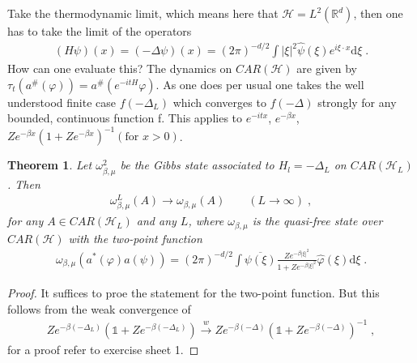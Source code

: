 \documentclass[
a4paper, %
11pt, %
onecolumn, %
openany, %
]{memoir}
\theoremstyle{definition}
\theoremstyle{remark}
\theoremstyle{plain}
\newtheorem{theorem}{Theorem}[chapter]
\begin{document}
Take the thermodynamic limit, which means here that $\mathcal{H}=L^2(\mathbb{R}^d)$, then one has to take the limit of the operators \begin{align}
(H\psi)(x)=(-\Delta \psi)(x)=(2\pi)^{-d/2}\int |\xi|^2\hat{\psi}(\xi)e^{i\xi\cdot x}\mathrm{d}\xi\; .
\end{align}
How can one evaluate this? The dynamics on $CAR(\mathcal{H})$ are given by $\tau_t(a^{\#}(\varphi))=a^{\#}(e^{-itH}\varphi)$. As one does per usual one takes the well understood finite case $f(-\Delta_L)$ which converges to $f(-\Delta)$ strongly for any bounded, continuous function f. This applies to $e^{-itx}$, $e^{-\beta x}$, $Ze^{-\beta x}(1+Ze^{-\beta x})^{-1} (\text{for }x>0)$.
\begin{theorem}
	Let $\omega_{\beta,\mu}^2$ be the Gibbs state associated to $H_l=-\Delta_L$ on $CAR(\mathcal{H}_L)$. Then \begin{align*}
	\omega_{\beta,\mu}^L(A)\overset{}{\longrightarrow}\omega_{\beta,\mu}(A) \qquad (L\rightarrow \infty)\; ,
	\end{align*}
	for any $A\in CAR(\mathcal{H}_{L})$ and any $L$, where $\omega_{\beta,\mu}$ is the quasi-free state over $CAR(\mathcal{H})$ with the two-point function \begin{align}
		\omega_{\beta,\mu}(a^*(\varphi)a(\psi))=(2\pi)^{-d/2}\int\overline{\psi(\xi)}\frac{Ze^{-\beta |\xi|^2}}{1+Ze^{-\beta|\xi|^2}}\hat{\varphi}(\xi)\mathrm{d}\xi\; .
	\end{align}
\end{theorem}
\begin{proof}
	It suffices to proe the statement for the two-point function. But this follows from the weak convergence of \begin{align}
	Ze^{-\beta(-\Delta_L)}(\mathds{1}+Ze^{-\beta(-\Delta_L)})\overset{w}{\longrightarrow}Ze^{-\beta(-\Delta)}\left(\mathds{1}+Ze^{-\beta(-\Delta)}\right)^{-1}\; ,
	\end{align}
	for a proof refer to exercise sheet 1.
\end{proof}
\end{document}

